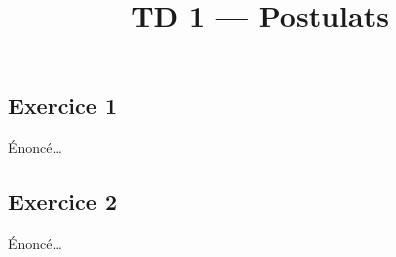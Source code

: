 \documentclass[
  french,
  letterpaper,
  DIV=11,
  numbers=noendperiod]{scrartcl}
\title{TD 1 --- Postulats}
\author{}
\date{}
\begin{document}
\maketitle


\subsection{Exercice 1}\label{exercice-1}

Énoncé\ldots{}

\subsection{Exercice 2}\label{exercice-2}

Énoncé\ldots{}
\end{document}
